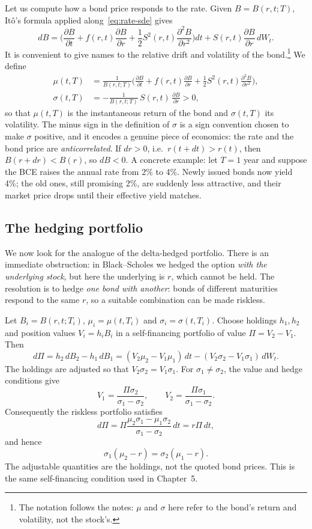 Let us compute how a bond price responds to the rate.
Given $B = B(r,t; T)$, It\^o's formula applied along~\eqref{eq:rate-sde} gives
\begin{equation}
dB = \biggl(\frac{\partial B}{\partial t} + f(r,t)\frac{\partial B}{\partial r} + \frac{1}{2}S^2(r,t)\frac{\partial^2 B}{\partial r^2}\biggr)dt + S(r,t)\frac{\partial B}{\partial r}\, dW_t.
\end{equation}
It is convenient to give names to the relative drift and volatility of the bond.\footnote{The notation follows the notes: $\mu$ and $\sigma$ here refer to the bond's return and volatility, not the stock's.}
We define
\begin{align}
\mu(t,T) &= \frac{1}{B(r,t;T)}\biggl(\frac{\partial B}{\partial t} + f(r,t)\frac{\partial B}{\partial r} + \frac{1}{2}S^2(r,t)\frac{\partial^2 B}{\partial r^2}\biggr), \\[4pt]
\sigma(t,T) &= -\frac{1}{B(r,t;T)}\, S(r,t)\,\frac{\partial B}{\partial r} > 0,
\end{align}
so that $\mu(t,T)$ is the instantaneous return of the bond and $\sigma(t,T)$ its volatility.
The minus sign in the definition of $\sigma$ is a sign convention chosen to make $\sigma$ positive, and it encodes a genuine piece of economics: the rate and the bond price are \emph{anticorrelated}.
If $dr > 0$, i.e.\ $r(t+dt) > r(t)$, then $B(r+dr) < B(r)$, so $dB < 0$.
A concrete example: let $T = 1$ year and suppose the BCE raises the annual rate from 2\% to 4\%.
Newly issued bonds now yield 4\%; the old ones, still promising 2\%, are suddenly less attractive, and their market price drops until their effective yield matches.

\subsection{The hedging portfolio}

We now look for the analogue of the delta-hedged portfolio.
There is an immediate obstruction: in Black--Scholes we hedged the option \emph{with the underlying stock}, but here the underlying is $r$, which cannot be held.
The resolution is to hedge \emph{one bond with another}: bonds of different maturities respond to the same $r$, so a suitable combination can be made riskless.

Let $B_i=B(r,t;T_i)$, $\mu_i=\mu(t,T_i)$ and $\sigma_i=\sigma(t,T_i)$.
Choose holdings $h_1,h_2$ and position values $V_i=h_iB_i$ in a self-financing portfolio of value $\Pi=V_2-V_1$.
Then
\[
 d\Pi=h_2\,dB_2-h_1\,dB_1
 =(V_2\mu_2-V_1\mu_1)\,dt-(V_2\sigma_2-V_1\sigma_1)\,dW_t.
\]
The holdings are adjusted so that $V_2\sigma_2=V_1\sigma_1$.
For $\sigma_1\ne\sigma_2$, the value and hedge conditions give
\[
 V_1=\frac{\Pi\sigma_2}{\sigma_1-\sigma_2},\qquad
 V_2=\frac{\Pi\sigma_1}{\sigma_1-\sigma_2}.
\]
Consequently the riskless portfolio satisfies
\[
 d\Pi=\Pi\frac{\mu_2\sigma_1-\mu_1\sigma_2}{\sigma_1-\sigma_2}\,dt=r\Pi\,dt,
\]
and hence
\[
 \sigma_1(\mu_2-r)=\sigma_2(\mu_1-r).
\]
The adjustable quantities are the holdings, not the quoted bond prices.
This is the same self-financing condition used in Chapter~5.

